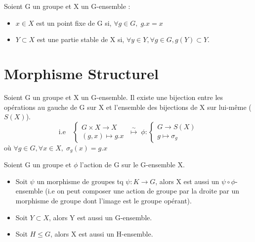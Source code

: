 \begin{definition}
	Soient G un groupe et X un G-ensemble :
	\begin{itemize}
		\item $x \in X$ est un point fixe de G si, $ \forall g \in G, \; g.x = x$ 
		\item $Y \subset X$ est une partie stable de X si, $ \forall y \in Y, \forall g \in G, g(Y) \subset Y$.
	\end{itemize}
\end{definition}



\section{Morphisme Structurel}

\begin{theorem}
	Soient G un groupe et X un G-ensemble. Il existe une bijection entre les opérations au gauche de G sur X 
	et l'ensemble des bijections de X sur lui-même ($S(X)$). 
	\[ \text{i.e} \quad 
		\begin{cases}
			G \times X \rightarrow X \\
			(g,x) \mapsto g.x
		\end{cases}
		\; \overset{\sim}{\longmapsto} \; \phi :
		\begin{cases}
			G \rightarrow S(X) \\ 
			g \mapsto \sigma_g 
		\end{cases}
	\]
	où $ \forall g \in G, \forall x \in X, \; \sigma_g(x) = g.x $
\end{theorem}


\begin{proposition}
	Soient G un groupe et $\phi$ l'action de G sur le G-ensemble X. 
	\begin{itemize}
		\item Soit $\psi$ un morphisme de groupes tq $ \psi : K \rightarrow G$, alors X est aussi un $\psi \circ \phi$-ensemble 
		(i.e on peut composer une action de groupe par la droite par un morphisme de groupe dont l'image est le groupe opérant).
		\item Soit $Y \subset X$, alors Y est aussi un G-ensemble. 
		\item Soit $H \leq G$, alors X est aussi un H-ensemble. 
	\end{itemize}
\end{proposition}

